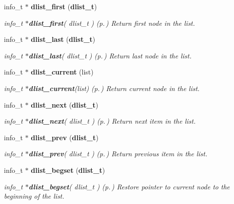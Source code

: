 \begin{CompactItemize}
info\_\-t $\ast$ {\bf dlist\_\-first} ({\bf dlist\_\-t})
\begin{CompactList}\small\item\em info\_\-t $\ast${\bf dlist\_\-first}( dlist\_\-t ) {\rm (p.\,\pageref{P__dlist_8h_a10})} Return first node in the list.\item\end{CompactList}\item 
info\_\-t $\ast$ {\bf dlist\_\-last} ({\bf dlist\_\-t})
\begin{CompactList}\small\item\em info\_\-t $\ast${\bf dlist\_\-last}( dlist\_\-t ) {\rm (p.\,\pageref{P__dlist_8h_a11})} Return last node in the list.\item\end{CompactList}\item 
info\_\-t $\ast$ {\bf dlist\_\-current} (list)
\begin{CompactList}\small\item\em info\_\-t $\ast${\bf dlist\_\-current}(list) {\rm (p.\,\pageref{P__dlist_8h_a12})} Return current node in the list.\item\end{CompactList}\item 
info\_\-t $\ast$ {\bf dlist\_\-next} ({\bf dlist\_\-t})
\begin{CompactList}\small\item\em info\_\-t $\ast${\bf dlist\_\-next}( dlist\_\-t ) {\rm (p.\,\pageref{P__dlist_8h_a13})} Return next item in the list.\item\end{CompactList}\item 
info\_\-t $\ast$ {\bf dlist\_\-prev} ({\bf dlist\_\-t})
\begin{CompactList}\small\item\em info\_\-t $\ast${\bf dlist\_\-prev}( dlist\_\-t ) {\rm (p.\,\pageref{P__dlist_8h_a14})} Return previous item in the list.\item\end{CompactList}\item 
info\_\-t $\ast$ {\bf dlist\_\-begset} ({\bf dlist\_\-t})
\begin{CompactList}\small\item\em info\_\-t $\ast${\bf dlist\_\-begset}( dlist\_\-t ) {\rm (p.\,\pageref{P__dlist_8h_a15})} Restore pointer to current node to the beginning of the list.\item\end{CompactList}\item 

\end{CompactItemize}
